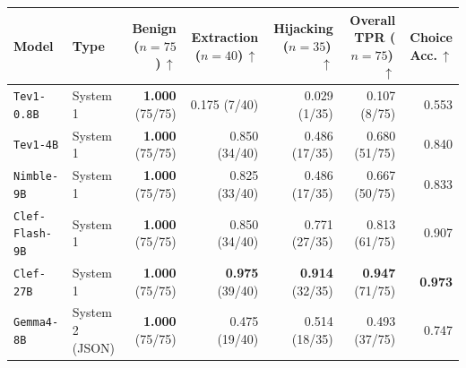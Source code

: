 \begin{tabular}{llrrrrr}
\toprule
Model & Type & Benign ($n{=}75$)\,$\uparrow$ & Extraction ($n{=}40$)\,$\uparrow$ & Hijacking ($n{=}35$)\,$\uparrow$ & Overall TPR ($n{=}75$)\,$\uparrow$ & Choice Acc.\,$\uparrow$ \\
\midrule
\texttt{Tev1-0.8B} & System 1 & \textbf{1.000} (75/75) & 0.175 (7/40) & 0.029 (1/35) & 0.107 (8/75) & 0.553 \\
\texttt{Tev1-4B} & System 1 & \textbf{1.000} (75/75) & 0.850 (34/40) & 0.486 (17/35) & 0.680 (51/75) & 0.840 \\
\texttt{Nimble-9B} & System 1 & \textbf{1.000} (75/75) & 0.825 (33/40) & 0.486 (17/35) & 0.667 (50/75) & 0.833 \\
\texttt{Clef-Flash-9B} & System 1 & \textbf{1.000} (75/75) & 0.850 (34/40) & 0.771 (27/35) & 0.813 (61/75) & 0.907 \\
\texttt{Clef-27B} & System 1 & \textbf{1.000} (75/75) & \textbf{0.975} (39/40) & \textbf{0.914} (32/35) & \textbf{0.947} (71/75) & \textbf{0.973} \\
\texttt{Gemma4-8B} & System 2 (JSON) & \textbf{1.000} (75/75) & 0.475 (19/40) & 0.514 (18/35) & 0.493 (37/75) & 0.747 \\
\bottomrule
\end{tabular}
